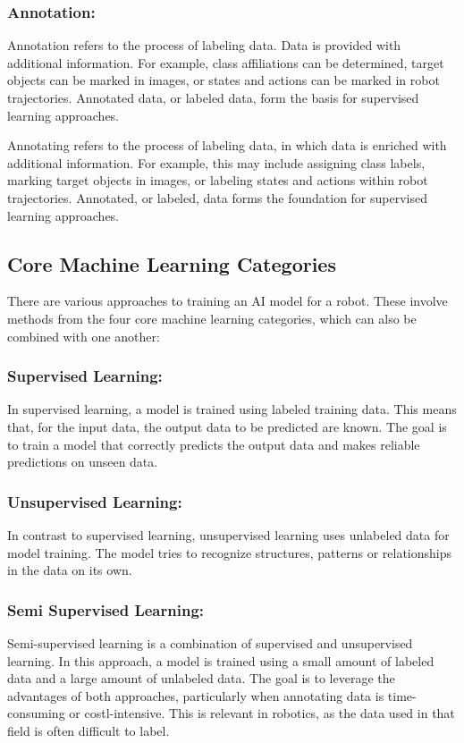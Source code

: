 \subsubsection{Annotation:}

Annotation refers to the process of labeling data. Data is provided with additional information. For example, class affiliations can be determined, target objects can be marked in images, or states and actions can be marked in robot trajectories. Annotated data, or labeled data, form the basis for supervised learning approaches.

Annotating refers to the process of labeling data, in which data is enriched with additional information. For example, this may include assigning class labels, marking target objects in images, or labeling states and actions within robot trajectories. Annotated, or labeled, data forms the foundation for supervised learning approaches.


\subsection{Core Machine Learning Categories}
There are various approaches to training an AI model for a robot. These involve methods from the four core machine learning categories, which can also be combined with one another:

\subsubsection{Supervised Learning: }

In supervised learning, a model is trained using labeled training data. This means that, for the input data, the output data to be predicted are known. The goal is to train a model that correctly predicts the output data and makes reliable predictions on unseen data. 


\subsubsection{Unsupervised Learning: }
In contrast to supervised learning, unsupervised learning uses unlabeled data for model training. The model tries to recognize structures, patterns or relationships in the data on its own. 

\subsubsection{Semi Supervised Learning: }
Semi-supervised learning is a combination of supervised and unsupervised learning. In this approach, a model is trained using a small amount of labeled data and a large amount of unlabeled data. The goal is to leverage the advantages of both approaches, particularly when annotating data is time-consuming or costl-intensive. This is relevant in robotics, as the data used in that field is often difficult to label.

